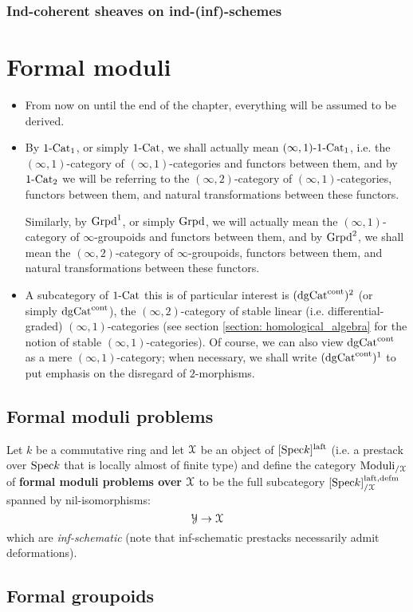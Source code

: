             \subsubsection{Ind-coherent sheaves on ind-(inf)-schemes}
        
    \section{Formal moduli}
        \begin{convention} \label{conv: moduli_everything_is_derived}
            \noindent
            \begin{itemize}
                \item From now on until the end of the chapter, everything will be assumed to be derived. 
                \item By $1\text{-}\mathrm{Cat}_1$, or simply $1\text{-}\mathrm{Cat}$, we shall actually mean $(\infty, 1)\text{-}1\text{-}\mathrm{Cat}_1$, i.e. the $(\infty, 1)$-category of $(\infty, 1)$-categories and functors between them, and by $1\text{-}\mathrm{Cat}_2$ we will be referring to the $(\infty, 2)$-category of $(\infty, 1)$-categories, functors between them, and natural transformations between these functors. 
                
                Similarly, by $\mathrm{Grpd}^1$, or simply $\mathrm{Grpd}$, we will actually mean the $(\infty, 1)$-category of $\infty$-groupoids and functors between them, and by $\mathrm{Grpd}^2$, we shall mean the $(\infty, 2)$-category of $\infty$-groupoids, functors between them, and natural transformations between these functors.
                \item A subcategory of $1\text{-}\mathrm{Cat}$ this is of particular interest is $(\mathrm{dg}\mathrm{Cat}^{\mathrm{cont}})^2$ (or simply $\mathrm{dg}\mathrm{Cat}^{\mathrm{cont}}$), the $(\infty, 2)$-category of stable linear (i.e. differential-graded) $(\infty, 1)$-categories (see section \ref{section: homological_algebra} for the notion of stable $(\infty, 1)$-categories). Of course, we can also view $\mathrm{dg}\mathrm{Cat}^{\mathrm{cont}}$ as a mere $(\infty, 1)$-category; when necessary, we shall write $(\mathrm{dg}\mathrm{Cat}^{\mathrm{cont}})^1$ to put emphasis on the disregard of $2$-morphisms.
            \end{itemize} 
        \end{convention}
    
        \subsection{Formal moduli problems}
            \begin{definition} \label{def: formal_moduli_problems}
                Let $k$ be a commutative ring and let $\mathcal{X}$ be an object of $[\mathrm{Spec} k]^{\mathrm{laft}}$ (i.e. a prestack over $\mathrm{Spec} k$ that is locally almost of finite type) and define the category $\mathrm{Moduli}_{/\mathcal{X}}$ of \textbf{formal moduli problems over $\mathcal{X}$} to be the full subcategory $[\mathrm{Spec} k]^{\mathrm{laft}, \mathrm{defm}}_{/\mathcal{X}}$ spanned by nil-isomorphisms:
                    $$\mathcal{Y} \to \mathcal{X}$$
                which are \textit{inf-schematic} (note that inf-schematic prestacks necessarily admit deformations).
            \end{definition}
        
        \subsection{Formal groupoids}